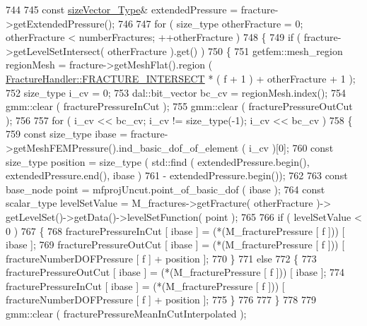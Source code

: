 \begin{DoxyCode}
744 
745         \textcolor{keyword}{const} \hyperlink{Core_8h_a83c51913d041a5001e8683434c09857f}{sizeVector\_Type}& extendedPressure = fracture->getExtendedPressure();
746 
747         \textcolor{keywordflow}{for} ( size\_type otherFracture = 0; otherFracture < numberFractures; ++otherFracture )
748         \{
749             \textcolor{keywordflow}{if} ( fracture->getLevelSetIntersect( otherFracture ).get() )
750             \{
751                 getfem::mesh\_region regionMesh = fracture->getMeshFlat().region ( 
      \hyperlink{classFractureHandler_a495ad4fc72d0c47c8f0424842f1153aaa781cae3f3b99bf9357fed2833d315537}{FractureHandler::FRACTURE\_INTERSECT} * ( f + 1 ) + otherFracture + 1 );
752                 size\_type i\_cv = 0;
753                 dal::bit\_vector bc\_cv = regionMesh.index();
754                 gmm::clear ( fracturePressureInCut );
755                 gmm::clear ( fracturePressureOutCut );
756 
757                 \textcolor{keywordflow}{for} ( i\_cv << bc\_cv; i\_cv != size\_type(-1); i\_cv << bc\_cv )
758                 \{
759                     \textcolor{keyword}{const} size\_type ibase = fracture->getMeshFEMPressure().ind\_basic\_dof\_of\_element ( i\_cv 
      )[0];
760                     \textcolor{keyword}{const} size\_type position = size\_type ( std::find ( extendedPressure.begin(), 
      extendedPressure.end(), ibase )
761                                                 - extendedPressure.begin());
762 
763                     \textcolor{keyword}{const} base\_node point = mfprojUncut.point\_of\_basic\_dof ( ibase );
764                     \textcolor{keyword}{const} scalar\_type levelSetValue = M\_fractures->getFracture( otherFracture )->
      getLevelSet()->getData()->levelSetFunction( point );
765 
766                     \textcolor{keywordflow}{if} ( levelSetValue < 0 )
767                     \{
768                         fracturePressureInCut [ ibase ] = (*(M\_fracturePressure [ f ])) [ ibase ];
769                         fracturePressureOutCut [ ibase ] = (*(M\_fracturePressure [ f ])) [ 
      fractureNumberDOFPressure [ f ] + position ];
770                     \}
771                     \textcolor{keywordflow}{else}
772                     \{
773                         fracturePressureOutCut [ ibase ] = (*(M\_fracturePressure [ f ])) [ ibase ];
774                         fracturePressureInCut [ ibase ] = (*(M\_fracturePressure [ f ])) [ 
      fractureNumberDOFPressure [ f ] + position ];
775                     \}
776 
777                 \}
778 
779                 gmm::clear ( fracturePressureMeanInCutInterpolated );

\end{DoxyCode}
